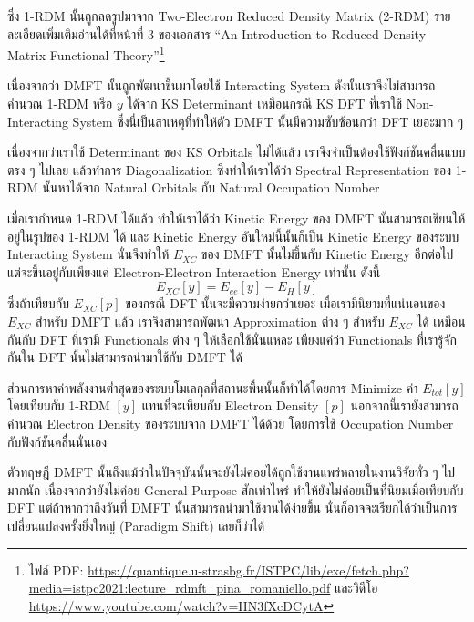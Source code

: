 ซึ่ง 1-RDM นั้นถูกลดรูปมาจาก Two-Electron Reduced Density Matrix (2-RDM) รายละเอียดเพิ่มเติมอ่านได้ที่หน้าที่ 3 ของเอกสาร \enquote{An Introduction to Reduced Density Matrix Functional Theory}\footnote{ไฟล์ PDF: \url{https://quantique.u-strasbg.fr/ISTPC/lib/exe/fetch.php?media=istpc2021:lecture_rdmft_pina_romaniello.pdf} และวิดีโอ \url{https://www.youtube.com/watch?v=HN3fXcDCytA}}

เนื่องจากว่า DMFT นั้นถูกพัฒนาขึ้นมาโดยใช้ Interacting System ดังนั้นเราจึงไม่สามารถคำนวณ 1-RDM หรือ $y$ ได้จาก KS Determinant เหมือนกรณี KS DFT ที่เราใช้ Non-Interacting System ซึ่งนี่เป็นสาเหตุที่ทำให้ตัว DMFT นั้นมีความซับซ้อนกว่า DFT เยอะมาก ๆ

เนื่องจากว่าเราใช้ Determinant ของ KS Orbitals ไม่ได้แล้ว เราจึงจำเป็นต้องใช้ฟังก์ชันคลื่นแบบตรง ๆ ไปเลย แล้วทำการ Diagonalization ซึ่งทำให้เราได้ว่า Spectral Representation ของ 1-RDM นั้นหาได้จาก Natural Orbitals กับ Natural Occupation Number

เมื่อเรากำหนด 1-RDM ได้แล้ว ทำให้เราได้ว่า Kinetic Energy ของ DMFT นั้นสามารถเขียนให้อยู่ในรูปของ 1-RDM ได้ และ Kinetic Energy อันใหม่นี้นั้นก็เป็น Kinetic Energy ของระบบ Interacting System นั่นจึงทำให้ $E_{XC}$ ของ DMFT นั้นไม่ขึ้นกับ Kinetic Energy อีกต่อไป แต่จะขึ้นอยู่กับเพียงแค่ Electron-Electron Interaction Energy เท่านั้น ดังนี้
%
\begin{equation}
  E_{XC}[y] 
  = 
  E_{ee}[y] - E_{H}[y]
\end{equation}
%
ซึ่งถ้าเทียบกับ $E_{XC}[p]$ ของกรณี DFT นั้นจะมีความง่ายกว่าเยอะ เมื่อเรามีนิยามที่แน่นอนของ $E_{XC}$ สำหรับ DMFT แล้ว เราจึงสามารถพัฒนา Approximation ต่าง ๆ สำหรับ $E_{XC}$ ได้ เหมือนกันกับ DFT ที่เรามี Functionals ต่าง ๆ ให้เลือกใช้นั่นแหละ เพียงแค่ว่า Functionals ที่เรารู้จักกันใน DFT นั้นไม่สามารถนำมาใช้กับ DMFT ได้

ส่วนการหาค่าพลังงานต่ำสุดของระบบโมเลกุลที่สถานะพื้นนั้นก็ทำได้โดยการ Minimize ค่า $E_{tot}[y]$ โดยเทียบกับ 1-RDM $[y]$ แทนที่จะเทียบกับ Electron Density $[p]$ นอกจากนี้เรายังสามารถคำนวณ Electron Density ของระบบจาก DMFT ได้ด้วย โดยการใช้ Occupation Number กับฟังก์ชันคลื่นนั่นเอง

ตัวทฤษฎี DMFT นั้นถึงแม้ว่าในปัจจุบันนั้นจะยังไม่ค่อยได้ถูกใช้งานแพร่หลายในงานวิจัยทั่ว ๆ ไปมากนัก เนื่องจากว่ายังไม่ค่อย General Purpose สักเท่าไหร่ ทำให้ยังไม่ค่อยเป็นที่นิยมเมื่อเทียบกับ DFT แต่ถ้าหากว่าถึงวันที่่ DMFT นั้นสามารถนำมาใช้งานได้ง่ายขึ้น นั่นก็อาจจะเรียกได้ว่าเป็นการเปลี่ยนแปลงครั้งยิ่งใหญ่ (Paradigm Shift) เลยก็ว่าได้
